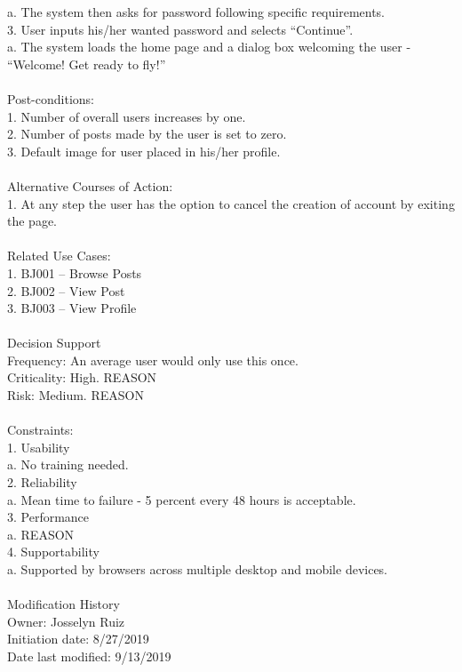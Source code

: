 \documentclass{report}
\begin{document}
	a.	The system then asks for password following specific requirements.\\
3.	User inputs his/her wanted password and selects “Continue”. \\
	a.	The system loads the home page and a dialog box welcoming the user - “Welcome! Get ready to fly!”\\
\\
Post-conditions: \\
1.	Number of overall users increases by one.\\
2.	Number of posts made by the user is set to zero.\\
3.	Default image for user placed in his/her profile.\\
\\
Alternative Courses of Action:\\
1.	At any step the user has the option to cancel the creation of account by exiting the page.\\
\\
Related Use Cases: \\
1.	BJ001 – Browse Posts\\
2.	BJ002 – View Post\\
3.	BJ003 – View Profile\\
\\
Decision Support\\
     Frequency: An average user would only use this once.\\
     Criticality: High. REASON\\
     Risk: Medium. REASON\\
\\
Constraints:\\
1.	Usability\\
a.	No training needed.\\
2.	Reliability\\
a.	Mean time to failure - 5 percent every 48 hours is acceptable.\\
3.	Performance \\
a.	REASON\\
4.	Supportability\\
a.	Supported by browsers across multiple desktop and mobile devices.\\
\\
Modification History\\
     Owner: Josselyn Ruiz\\
     Initiation date: 8/27/2019\\
     Date last modified: 9/13/2019\\
\end{document}
